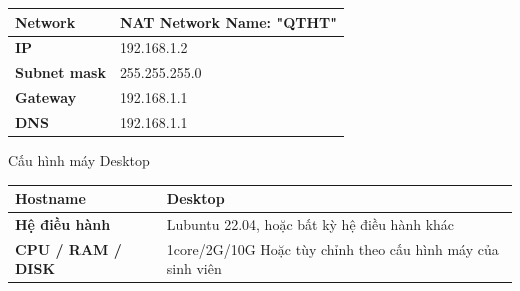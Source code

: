 \documentclass[a4paper, 11pt]{article}
\begin{document}
\begin{itemize}
\begin{minipage}{\linewidth}
\begin{multicols}{2}
\begin{minipage}{\linewidth}
\begin{tabular}{| p{.3\linewidth} | p{.4\linewidth} |}
                          \textbf{Network}          & NAT Network \newline Name: "QTHT"                                    \\
                          \hline

                          \textbf{IP}               & 192.168.1.2                                                          \\
                          \hline

                          \textbf{Subnet mask}      & 255.255.255.0                                                        \\
                          \hline

                          \textbf{Gateway}          & 192.168.1.1                                                          \\
                          \hline

                          \textbf{DNS}              & 192.168.1.1                                                          \\
                          \hline
                      \end{tabular}
                  \end{minipage}

                  \begin{minipage}{\linewidth}
                      \captionsetup{type=table}
                      \caption{Cấu hình máy Desktop}
                      \centering
                      \begin{tabular}{| p{.3\linewidth} | p{.4\linewidth} |}
                          \hline
                          \textbf{Hostname}                                              & Desktop                                                              \\
                          \hline

                          \textbf{Hệ điều hành}                                          & Lubuntu 22.04, \newline hoặc bất kỳ hệ điều hành khác                \\
                          \hline

                          \textbf{CPU / RAM / DISK}                                      & 1core/2G/10G \newline Hoặc tùy chỉnh theo cấu hình máy của sinh viên \\
                          \hline


\end{tabular}
\end{minipage}
\end{multicols}
\end{minipage}
\end{itemize}
\end{document}
